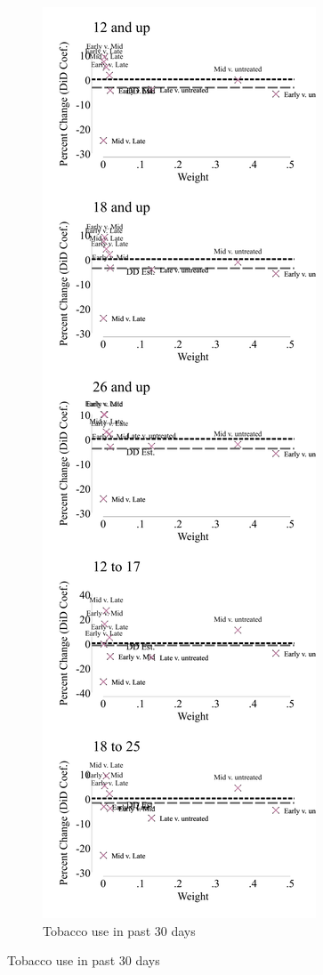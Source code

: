 \documentclass[12pt]{article}%
\begin{document}
\begin{figure}
\begin{minipage}{.9\linewidth}
\begin{subfigure}[b]{0.32\columnwidth}
    \label{fig:bacon_lead_lag_alc_30}
  \end{subfigure}
  \hfill %
  \begin{subfigure}[b]{0.32\columnwidth}
      \caption{\scriptsize{Tobacco use in past 30 days}}
    \includegraphics[width=\linewidth]{../output/plots/bacon_weights_ln_tob_use_30.pdf}

\end{subfigure}
\end{minipage}
\end{figure}
\end{document}
